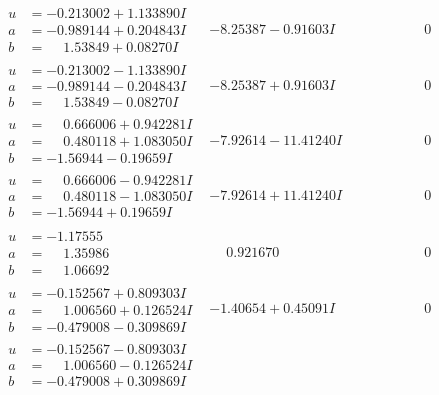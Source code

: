\documentclass[1p]{elsarticle_modified}
\theoremstyle{definition}
\begin{document}
$$\begin{array}{c|c|c}
\begin{aligned}
u &= -0.213002 + 1.133890 I \\
a &= -0.989144 + 0.204843 I \\
b &= \phantom{-}1.53849 + 0.08270 I\end{aligned}
 & -8.25387 - 0.91603 I & \phantom{-0.000000 } 0 \\ \hline\begin{aligned}
u &= -0.213002 - 1.133890 I \\
a &= -0.989144 - 0.204843 I \\
b &= \phantom{-}1.53849 - 0.08270 I\end{aligned}
 & -8.25387 + 0.91603 I & \phantom{-0.000000 } 0 \\ \hline\begin{aligned}
u &= \phantom{-}0.666006 + 0.942281 I \\
a &= \phantom{-}0.480118 + 1.083050 I \\
b &= -1.56944 - 0.19659 I\end{aligned}
 & -7.92614 - 11.41240 I & \phantom{-0.000000 } 0 \\ \hline\begin{aligned}
u &= \phantom{-}0.666006 - 0.942281 I \\
a &= \phantom{-}0.480118 - 1.083050 I \\
b &= -1.56944 + 0.19659 I\end{aligned}
 & -7.92614 + 11.41240 I & \phantom{-0.000000 } 0 \\ \hline\begin{aligned}
u &= -1.17555\phantom{ +0.000000I} \\
a &= \phantom{-}1.35986\phantom{ +0.000000I} \\
b &= \phantom{-}1.06692\phantom{ +0.000000I}\end{aligned}
 & \phantom{-}0.921670\phantom{ +0.000000I} & \phantom{-0.000000 } 0 \\ \hline\begin{aligned}
u &= -0.152567 + 0.809303 I \\
a &= \phantom{-}1.006560 + 0.126524 I \\
b &= -0.479008 - 0.309869 I\end{aligned}
 & -1.40654 + 0.45091 I & \phantom{-0.000000 } 0 \\ \hline\begin{aligned}
u &= -0.152567 - 0.809303 I \\
a &= \phantom{-}1.006560 - 0.126524 I \\
b &= -0.479008 + 0.309869 I\end{aligned}

\end{array}$$
\end{document}
